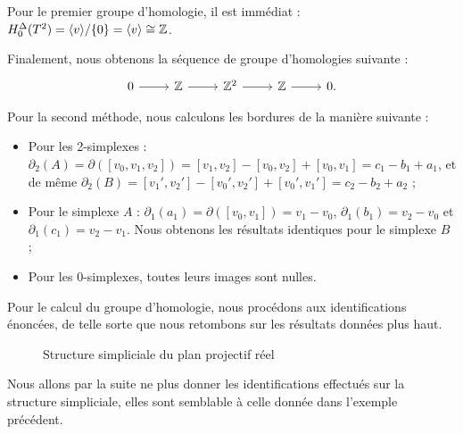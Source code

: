 \begin{exemple}
Pour le premier groupe d'homologie, il est immédiat : $H^\Delta_0(T^2)=\langle v\rangle/\{0\}=\langle v\rangle\cong \mathbb{Z}$.

Finalement, nous obtenons la séquence de groupe d'homologies suivante : \[\begin{tikzcd}
    0\arrow[r]&\bb{Z}\arrow[r]&\bb{Z}^2\arrow[r]&\bb{Z}\arrow[r]&0.
\end{tikzcd}\]

Pour la second méthode, nous calculons les bordures de la manière suivante : \begin{itemize}
    \item Pour les 2-simplexes : $\partial_2(A)=\partial([v_0,v_1,v_2])=[v_1,v_2]-[v_0,v_2]+[v_0,v_1]=c_1-b_1+a_1$, et de même $\partial_2(B)=[v_1',v_2']-[v_0',v_2']+[v_0',v_1']=c_2-b_2+a_2$ ;
    \item Pour le simplexe $A$ : $\partial_1(a_1)=\partial([v_0,v_1])=v_1-v_0$, $\partial_1(b_1)=v_2-v_0$ et ${\partial_1(c_1)=v_2-v_1}$. Nous obtenons les résultats identiques pour le simplexe $B$ ;
    \item Pour les 0-simplexes, toutes leurs images sont nulles.
\end{itemize}
Pour le calcul du groupe d'homologie, nous procédons aux identifications énoncées, de telle sorte que nous retombons sur les résultats données plus haut.
\end{exemple}

\begin{wrapfigure}{r}{0.4\linewidth}
\centering
{}
\caption{\centering Structure simpliciale du plan projectif réel}
\label{tkz:simplicial-proj}
\end{wrapfigure}
Nous allons par la suite ne plus donner les identifications effectués sur la structure simpliciale, elles sont semblable à celle donnée dans l'exemple précédent.

